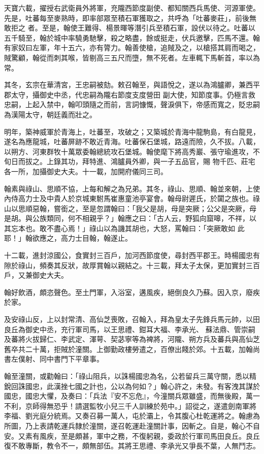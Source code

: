 \begin{pinyinscope}
 天寶六載，擢授右武衛員外將軍，充隴西節度副使、都知關西兵馬使、河源軍使。先是，吐蕃每至麥熟時，即率部眾至積石軍獲取之，共呼為「吐蕃麥莊」，前後無敢拒之
 者。至是，翰使王難得、楊景暉等潛引兵至積石軍，設伏以待之。吐蕃以五千騎至，翰於城中率驍勇馳擊，殺之略盡，餘或挺走，伏兵邀擊，匹馬不還。翰有家奴曰左軍，年十五六，亦有膂力。翰善使槍，追賊及之，以槍搭其肩而喝之，賊驚顧，翰從而刺其喉，皆剔高三五尺而墮，無不死者。左車輒下馬斬首，率以為常。



 其冬，玄宗在華清宮，王忠嗣被劾。敕召翰至，與語悅之，遂以為鴻臚卿，兼西平郡太守，攝御史中丞，代忠嗣為隴右節度支度營田
 副大使，知節度事。仍極言救忠嗣，上起入禁中，翰叩頭隨之而前，言詞慷慨，聲淚俱下，帝感而寬之，貶忠嗣為漢陽太守，朝廷義而壯之。



 明年，築神威軍於青海上，吐蕃至，攻破之；又築城於青海中龍駒島，有白龍見，遂名為應龍城，吐蕃屏跡不敢近青海。吐蕃保石堡城，路遠而險，久不拔。八載，以朔方、河東群牧十萬眾委翰總統攻石堡城。翰使麾下將高秀巖、張守瑜進攻，不旬日而拔之。上錄其功，拜特進、鴻臚員外卿，與一子五品官，賜
 物千匹、莊宅各一所，加攝御史大夫。十一載，加開府儀同三司。



 翰素與祿山、思順不協，上每和解之為兄弟。其冬，祿山、思順、翰並來朝，上使內侍高力士及中貴人於京城東駙馬崔惠童池亭宴會。翰母尉遲氏，於闐之族也。祿山以思順惡翰，嘗銜之，至是忽謂翰曰：「我父是胡，母是突厥；公父是突厥，母是胡。與公族類同，何不相親乎？」翰應之曰：「古人云，野狐向窟嗥，不祥，以其忘本也。敢不盡心焉！」祿山以為譏其胡也，大怒，罵翰曰：「突厥敢如
 此耶！」翰欲應之，高力士目翰，翰遂止。



 十二載，進封涼國公，食實封三百戶，加河西節度使，尋封西平郡王。時楊國忠有隙於祿山，頻奏其反狀，故厚賞翰以親結之。十三載，拜太子太保，更加實封三百戶，又兼御史大夫。



 翰好飲酒，頗恣聲色。至土門軍，入浴室，遘風疾，絕倒良久乃蘇。因入京，廢疾於家。



 及安祿山反，上以封常清、高仙芝喪敗，召翰入，拜為皇太子先鋒兵馬元帥，以田良丘為御史中丞，充行軍司馬，以王思禮、鉗耳大福、李承光、
 蘇法鼎、管崇嗣及蕃將火拔歸仁、李武定、渾萼、契苾寧等為裨將，河隴、朔方兵及蕃兵與高仙芝舊卒共二十萬，拒賊於潼關。上御勤政樓勞遣之，百僚出餞於郊。十五載，加翰尚書左僕射、同中書門下平章事。



 翰至潼關，或勸翰曰：「祿山阻兵，以誅楊國忠為名，公若留兵三萬守關，悉以精銳回誅國忠，此漢挫七國之計也，公以為何如？」翰心許之，未發。有客洩其謀於國忠，國忠大懼，及奏曰：「兵法『安不忘危』，今潼關兵眾雖盛，而無後殿，萬一
 不利，京師得無恐乎！請選監牧小兒三千人訓練於苑中。」詔從之，遂遣劍南軍將李福、劉光庭分統焉。又奏召募一萬人，屯於灞上，令其腹心杜乾運將之。翰慮為所圖，乃上表請乾運兵隸於潼關，遂召乾運赴潼關計事，因斬之。自是，翰心不自安。又素有風疾，至是頗甚，軍中之務，不復躬親，委政於行軍司馬田良丘。良丘復不敢專斷，教令不一，頗無部伍。其將王思禮、李承光又爭長不葉，人無鬥志。




\end{pinyinscope}
